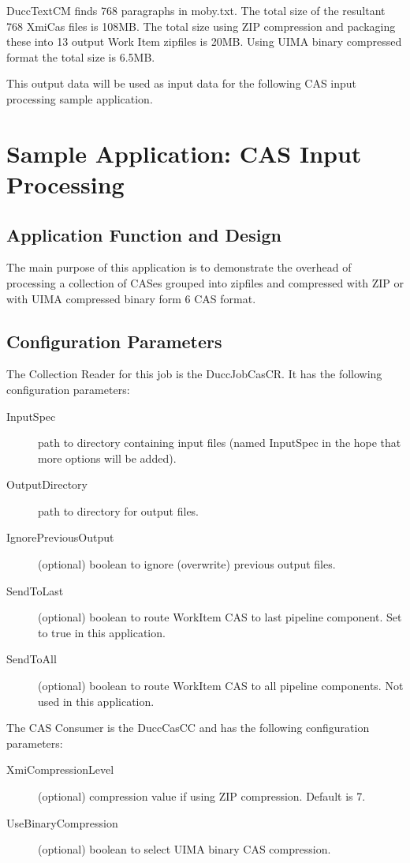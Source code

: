 DuccTextCM finds 768 paragraphs in moby.txt. The total size of the resultant 768 XmiCas files is 108MB. The total size using ZIP compression and packaging these into 13 output Work Item zipfiles is 20MB. Using UIMA binary compressed format the total size is 6.5MB.

This output data will be used as input data for the following CAS input processing sample application.


\chapter{Sample Application: CAS Input Processing}

\section{Application Function and Design}
The main purpose of this application is to demonstrate the overhead of processing a collection of CASes grouped into zipfiles 
and compressed with ZIP or with UIMA compressed binary form 6 CAS format.


\section{Configuration Parameters}
The Collection Reader for this job is the DuccJobCasCR. It has the following configuration
parameters:

\begin{description}
    \item[InputSpec] path to directory containing input files (named InputSpec in the hope that more options will be added).
    \item[OutputDirectory] path to directory for output files.
    \item[IgnorePreviousOutput] (optional) boolean to ignore (overwrite) previous output files.
    \item[SendToLast] (optional) boolean to route WorkItem CAS to last pipeline component. Set to true in this application.
    \item[SendToAll] (optional) boolean to route WorkItem CAS to all pipeline components. Not used in this application.
\end{description}


The CAS Consumer is the DuccCasCC and has the following configuration parameters:

\begin{description}
  \item[XmiCompressionLevel] (optional) compression value if using ZIP compression. Default is 7.
  \item[UseBinaryCompression] (optional) boolean to select UIMA binary CAS compression.
\end{description}

